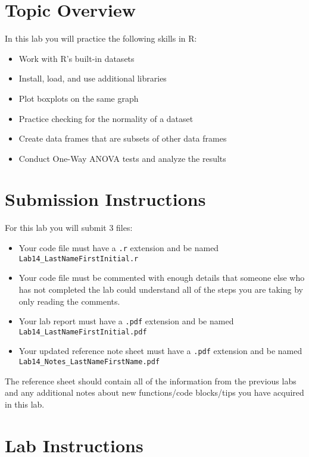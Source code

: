 \documentclass{article}
\begin{document}
\section{Topic Overview}
In this lab you will practice the following skills in R:

\begin{itemize}
    \item Work with R’s built-in datasets
    \item Install, load, and use additional libraries
    \item Plot boxplots on the same graph
    \item Practice checking for the normality of a dataset
    \item Create data frames that are subsets of other data frames
    \item Conduct One-Way ANOVA tests and analyze the results
\end{itemize}

\section*{Submission Instructions}

For this lab you will submit 3 files:

\begin{itemize}
    \item Your code file must have a \texttt{.r} extension and be named \texttt{Lab14\_LastNameFirstInitial.r}
    \item Your code file must be commented with enough details that someone else who has not completed the lab could understand all of the steps you are taking by only reading the comments.
    \item Your lab report must have a \texttt{.pdf} extension and be named \texttt{Lab14\_LastNameFirstInitial.pdf}
    \item Your updated reference note sheet must have a \texttt{.pdf} extension and be named \texttt{Lab14\_Notes\_LastNameFirstName.pdf}
\end{itemize}

The reference sheet should contain all of the information from the previous labs and any additional notes about new functions/code blocks/tips you have acquired in this lab.

\section*{Lab Instructions}
\end{document}
